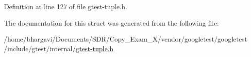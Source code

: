 Definition at line 127 of file gtest-\/tuple.\+h.



The documentation for this struct was generated from the following file\+:\begin{DoxyCompactItemize}
\item 
/home/bhargavi/\+Documents/\+S\+D\+R/\+Copy\+\_\+\+Exam\+\_\+X/vendor/googletest/googletest/include/gtest/internal/\hyperlink{gtest-tuple_8h}{gtest-\/tuple.\+h}\end{DoxyCompactItemize}
